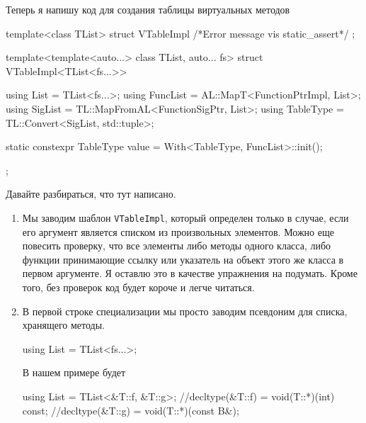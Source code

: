 Теперь я напишу код для создания таблицы виртуальных методов
\begin{cppcode}
template<class TList>
struct VTableImpl { /*Error message vis static_assert*/ };

template<template<auto...> class TList, auto... fs>
struct VTableImpl<TList<fs...>> {
  using List = TList<fs...>;
  using FuncList = AL::MapT<FunctionPtrImpl, List>;
  using SigList = TL::MapFromAL<FunctionSigPtr, List>;
  using TableType = TL::Convert<SigList, std::tuple>;
  
  static constexpr TableType value = With<TableType, FuncList>::init();
};
\end{cppcode}
Давайте разбираться, что тут написано.
\begin{enumerate}
\item Мы заводим шаблон \verb"VTableImpl", который определен только в случае, если его аргумент является списком из произвольных элементов.
Можно еще повесить проверку, что все элементы либо методы одного класса, либо функции принимающие ссылку или указатель на объект этого же класса в первом аргументе.
Я оставлю это в качестве упражнения на подумать.
Кроме того, без проверок код будет короче и легче читаться.

\item В первой строке специализации мы просто заводим псевдоним для списка, хранящего методы.
\begin{cppcode}[numbers = none]
using List = TList<fs...>;
\end{cppcode}
В нашем примере будет
\begin{cppcode}[numbers = none]
using List = TList<&T::f, &T::g>;
//decltype(&T::f) = void(T::*)(int) const;
//decltype(&T::g) = void(T::*)(const B&);
\end{cppcode}


\end{enumerate}
